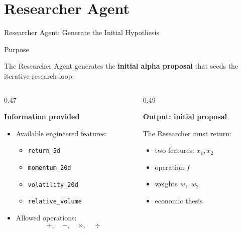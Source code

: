 \documentclass[10pt,aspectratio=169]{beamer}
\newcommand{\code}[1]{\texttt{\small #1}}
\begin{document}
\section{Researcher Agent}
\begin{frame}{Researcher Agent: Generate the Initial Hypothesis}

\small

\begin{block}{Purpose}

The Researcher Agent generates the \textbf{initial alpha proposal} that seeds the iterative research loop.

\end{block}

\vspace{0.15cm}

\begin{columns}[T,onlytextwidth]

\begin{column}{0.47\textwidth}

\textbf{Information provided}

\begin{itemize}
    \item Available engineered features:
    \begin{itemize}
        \item \code{return\_5d}
        \item \code{momentum\_20d}
        \item \code{volatility\_20d}
        \item \code{relative\_volume}
    \end{itemize}

    \item Allowed operations:
    \[
    +,\quad -,\quad \times,\quad \div
    \]
\end{itemize}

\end{column}

\begin{column}{0.49\textwidth}

\textbf{Output: initial proposal}

\vspace{0.1cm}

The Researcher must return:

\begin{itemize}
    \item two features: $x_1,x_2$
    \item operation $f$
    \item weights $w_1,w_2$
    \item economic thesis
\end{itemize}


\end{column}
\end{columns}
\end{frame}
\end{document}
